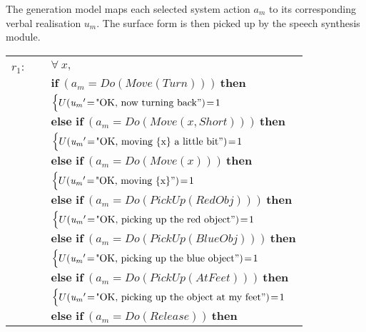 The generation model maps each selected system action $a_m$ to its corresponding verbal realisation $u_m$.  The surface form is then picked up by the speech synthesis module.
 
\begin{footnotesize}
\begin{longtable}{p{2cm}l}
$r_{1}$: \ \ & $\forall \ x, $ \\
& $ \textbf{if} \ (\mathit{a_m}\!=\!\mathit{Do(Move(Turn))}) \ \textbf{then} $ \\
 & \;\;\;\;\; $ \begin{cases}U(\mathit{u_m}'\!=\!\text{"OK, now turning back}")\!=\!1 \end{cases}$ \vspace{1mm} \\ & $ \textbf{else if} \ (\mathit{a_m}\!=\!\mathit{Do(Move({x},Short))}) \ \textbf{then}$ \\
& \;\;\;\;\; $ \begin{cases}U(\mathit{u_m}'\!=\!\text{"OK, moving \{x\} a little bit}")\!=\!1 \end{cases}$ \vspace{1mm} \\ & $ \textbf{else if} \ (\mathit{a_m}\!=\!\mathit{Do(Move({x}))}) \ \textbf{then}$ \\
& \;\;\;\;\; $ \begin{cases}U(\mathit{u_m}'\!=\!\text{"OK, moving \{x\}}")\!=\!1 \end{cases}$ \vspace{1mm} \\ & $ \textbf{else if} \ (\mathit{a_m}\!=\!\mathit{Do(PickUp(RedObj))}) \ \textbf{then}$ \\
& \;\;\;\;\; $ \begin{cases}U(\mathit{u_m}'\!=\!\text{"OK, picking up the red object}")\!=\!1 \end{cases}$ \vspace{1mm} \\ & $ \textbf{else if} \ (\mathit{a_m}\!=\!\mathit{Do(PickUp(BlueObj))}) \ \textbf{then}$ \\
& \;\;\;\;\; $ \begin{cases}U(\mathit{u_m}'\!=\!\text{"OK, picking up the blue object}")\!=\!1 \end{cases}$ \vspace{1mm} \\ & $ \textbf{else if} \ (\mathit{a_m}\!=\!\mathit{Do(PickUp(AtFeet))}) \ \textbf{then}$ \\
& \;\;\;\;\; $ \begin{cases}U(\mathit{u_m}'\!=\!\text{"OK, picking up the object at my feet}")\!=\!1 \end{cases}$ \vspace{1mm} \\ & $ \textbf{else if} \ (\mathit{a_m}\!=\!\mathit{Do(Release)}) \ \textbf{then}$ \\

\end{longtable}
\end{footnotesize}

